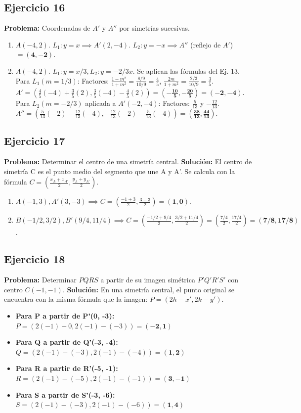 \documentclass[12pt, letterpaper]{article}
\begin{document}
\subsection{Ejercicio 16}
\textbf{Problema:} Coordenadas de $A'$ y $A''$ por simetrías sucesivas.
\begin{enumerate}[label=\alph*)]
    \item $A(-4,2)$. $L_1: y=x \implies A'(2,-4)$. $L_2: y=-x \implies A''$ (reflejo de $A'$) $= \mathbf{(4,-2)}$.
    \item $A(-4,2)$. $L_1: y=x/3, L_2: y=-2/3 x$. Se aplican las fórmulas del Ej. 13.
    Para $L_1 (m=1/3)$: Factores: $\frac{1-m^2}{1+m^2}=\frac{8/9}{10/9}=\frac{4}{5}$, $\frac{2m}{1+m^2}=\frac{2/3}{10/9}=\frac{3}{5}$.
    $A' = (\frac{4}{5}(-4) + \frac{3}{5}(2), \frac{3}{5}(-4) - \frac{4}{5}(2)) = \mathbf{(-\frac{10}{5}, -\frac{20}{5}) = (-2, -4)}$.
    Para $L_2 (m=-2/3)$ aplicada a $A'(-2,-4)$: Factores: $\frac{5}{13}$ y $-\frac{12}{13}$.
    $A'' = (\frac{5}{13}(-2) - \frac{12}{13}(-4), -\frac{12}{13}(-2) - \frac{5}{13}(-4)) = \mathbf{(\frac{38}{13}, \frac{44}{13})}$.
\end{enumerate}

\subsection{Ejercicio 17}
\textbf{Problema:} Determinar el centro de una simetría central.
\textbf{Solución:} El centro de simetría C es el punto medio del segmento que une A y A'. Se calcula con la fórmula $C = \left(\frac{x_A+x_{A'}}{2}, \frac{y_A+y_{A'}}{2}\right)$.
\begin{enumerate}[label=\alph*)]
    \item $A(-1,3), A'(3,-3) \implies C = \left(\frac{-1+3}{2}, \frac{3-3}{2}\right) = \mathbf{(1,0)}$.
    \item $B(-1/2, 3/2), B'(9/4, 11/4) \implies C = \left(\frac{-1/2+9/4}{2}, \frac{3/2+11/4}{2}\right) = \left(\frac{7/4}{2}, \frac{17/4}{2}\right) = \mathbf{(7/8, 17/8)}$.
\end{enumerate}

\subsection{Ejercicio 18}
\textbf{Problema:} Determinar $PQRS$ a partir de su imagen simétrica $P'Q'R'S'$ con centro $C(-1,-1)$.
\textbf{Solución:} En una simetría central, el punto original se encuentra con la misma fórmula que la imagen: $P=(2h-x', 2k-y')$.
\begin{itemize}
	\item \textbf{Para P a partir de P'(0, -3):} $P = (2(-1)-0, 2(-1)-(-3)) = \mathbf{(-2, 1)}$
	\item \textbf{Para Q a partir de Q'(-3, -4):} $Q = (2(-1)-(-3), 2(-1)-(-4)) = \mathbf{(1, 2)}$
	\item \textbf{Para R a partir de R'(-5, -1):} $R = (2(-1)-(-5), 2(-1)-(-1)) = \mathbf{(3, -1)}$
	\item \textbf{Para S a partir de S'(-3, -6):} $S = (2(-1)-(-3), 2(-1)-(-6)) = \mathbf{(1, 4)}$
\end{itemize}
\end{document}
